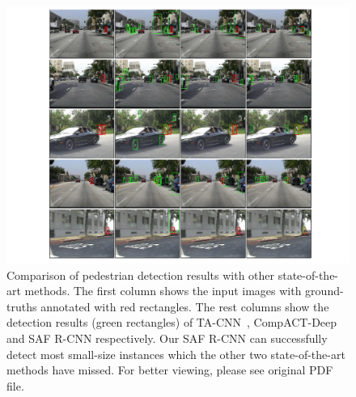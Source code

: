 \documentclass[journal]{IEEEtran}
\begin{document}
\begin{figure}
	\begin{center}
		\includegraphics[scale=0.75]{figures/visualization.pdf}
		\caption{{Comparison of pedestrian detection results with other state-of-the-art methods. The first column shows the input images with ground-truths annotated with red rectangles. The rest columns show the detection results (green rectangles) of TA-CNN~\cite{ta_cnn}, CompACT-Deep~\cite{compact} and SAF R-CNN respectively. Our SAF R-CNN can successfully detect most small-size instances which the other two state-of-the-art methods have missed. For better viewing, please see original PDF file.}}	
		\label{fig:visualization}
	\end{center}
	\vspace{-4mm}
\end{figure}
\end{document}
